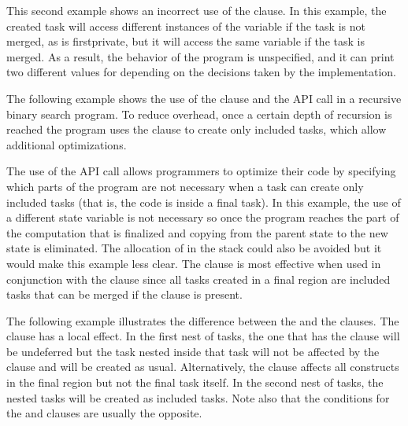 

This second example shows an incorrect use of the  clause. In 
this example, the created task will access different instances of the variable 
 if the task is not merged, as  is firstprivate, but 
it will access the same variable  if the task is merged. As a result, 
the behavior of the program is unspecified, and it can print two different values 
for  depending on the decisions taken by the implementation.



The following example shows the use of the  clause and the  
API call in a recursive binary search program. To reduce overhead, once a certain 
depth of recursion is reached the program uses the  clause to create 
only included tasks, which allow additional optimizations.

The use of the  API call allows programmers to optimize 
their code by specifying which parts of the program are not necessary when a task 
can create only included tasks (that is, the code is inside a final task). 
In this example, the use of a different state variable is not necessary so once 
the program reaches the part of the computation that is finalized and copying from 
the parent state to the new state is eliminated. The allocation of  
in the stack could also be avoided but it would make this example less clear. The 
 clause is most effective when used in conjunction with the  
clause since all tasks created in a final  region are included tasks 
that can be merged if the  clause is present.



The following example illustrates the difference between the   and the 
 clauses. The  clause has a local effect. In the first 
nest of tasks, the one that has the  clause will be undeferred but 
the task nested inside that task will not be affected by the  clause 
and will be created as usual. Alternatively, the  clause affects 
all  constructs in the final  region but not the final 
task itself. In the second nest of tasks, the nested tasks will be created as included 
tasks. Note also that the conditions for the  and  clauses 
are usually the opposite.




